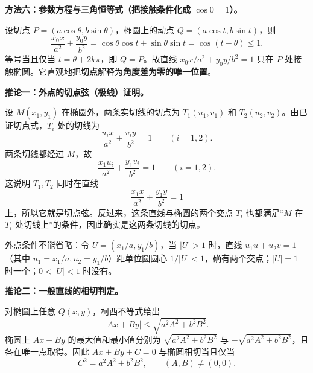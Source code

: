 \begin{proofbox}
\medskip
\textbf{方法六：参数方程与三角恒等式（把接触条件化成 $\cos0=1$）。}

设切点 $P=(a\cos\theta,b\sin\theta)$，椭圆上的动点 $Q=(a\cos t,b\sin t)$，则
\[
 \frac{x_0x}{a^2}+\frac{y_0y}{b^2}
 =\cos\theta\cos t+\sin\theta\sin t
 =\cos(t-\theta)\le1.
\]
等号当且仅当 $t=\theta+2k\pi$，即 $Q=P$。故直线 $x_0x/a^2+y_0y/b^2=1$ 只在 $P$ 处接触椭圆。它直观地把\textbf{切点}解释为\textbf{角度差为零的唯一位置}。

\medskip
\textbf{推论一：外点的切点弦（极线）证明。}

设 $M(x_1,y_1)$ 在椭圆外，两条实切线的切点为 $T_1(u_1,v_1)$ 和 $T_2(u_2,v_2)$。由已证切点式，$T_i$ 处的切线为
\[
 \frac{u_i x}{a^2}+\frac{v_i y}{b^2}=1\qquad(i=1,2).
\]
两条切线都经过 $M$，故
\[
 \frac{x_1u_i}{a^2}+\frac{y_1v_i}{b^2}=1\qquad(i=1,2).
\]
这说明 $T_1,T_2$ 同时在直线
\[
 \boxed{\frac{x_1x}{a^2}+\frac{y_1y}{b^2}=1}
\]
上，所以它就是切点弦。反过来，这条直线与椭圆的两个交点 $T_i$ 也都满足“$M$ 在 $T_i$ 处切线上”的条件，因此确实是这两条切线的切点。

外点条件不能省略：令 $U=(x_1/a,y_1/b)$，当 $|U|>1$ 时，直线 $u_1u+u_2v=1$（其中 $u_1=x_1/a,u_2=y_1/b$）距单位圆圆心 $1/|U|<1$，确有两个交点；$|U|=1$ 时一个；$0<|U|<1$ 时没有。

\medskip
\textbf{推论二：一般直线的相切判定。}

对椭圆上任意 $Q(x,y)$，柯西不等式给出
\[
 |Ax+By|\le\sqrt{a^2A^2+b^2B^2}.
\]
椭圆上 $Ax+By$ 的最大值和最小值分别为
$\sqrt{a^2A^2+b^2B^2}$ 与 $-\sqrt{a^2A^2+b^2B^2}$，且各在唯一点取得。因此 $Ax+By+C=0$ 与椭圆相切当且仅当
\[
 \boxed{C^2=a^2A^2+b^2B^2},\qquad(A,B)\ne(0,0).
\]
\end{proofbox}
